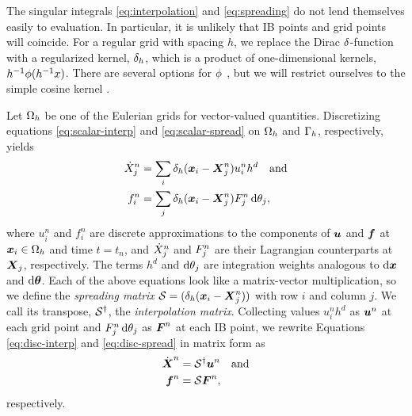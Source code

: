 The singular integrals \eqref{eq:interpolation} and \eqref{eq:spreading} do not lend
themselves easily to evaluation. In particular, it is unlikely that IB points and grid
points will coincide. For a regular grid with spacing $h$, we replace the Dirac
$\delta$-function with a regularized kernel, $\delta_h$, which is a product of
one-dimensional kernels, $h^{-1}\phi(h^{-1}x)$. There are several options for
$\phi$ \cite{Griffith:2020hi}, but we will restrict ourselves to the simple cosine
kernel \cite{Peskin:2002go}.

Let $\Omega_h$ be one of the Eulerian grids for vector-valued quantities. Discretizing
equations \eqref{eq:scalar-interp} and \eqref{eq:scalar-spread} on $\Omega_h$ and
$\Gamma_h$, respectively, yields
\begin{align}
    \label{eq:disc-interp}
    \dot{X}^n_j &= \sum_i \delta_h(\x_i-\X^n_j)u^n_i h^d \quad \text{and} \\
    \label{eq:disc-spread}
    f^n_i &= \sum_j \delta_h(\x_i-\X^n_j)F^n_j \d\theta_j,
\end{align}
where $u^n_i$ and $f^n_i$ are discrete approximations to the components of $\boldsymbol{u}$ and $\boldsymbol{f}$
at $\boldsymbol{x}_i\in\Omega_h$ and time $t=t_n$, and $\dot{X}^n_{\smash j}$ and $F^n_{\smash j}$
are their Lagrangian counterparts at $\boldsymbol{X}_{\smash j}$, respectively. The terms $h^d$ and
$\d\theta_{\smash j}$ are integration weights analogous to $\d\x$ and $\d\params$. Each
of the above equations look like a matrix-vector multiplication, so we define the
\emph{spreading matrix} $\mathcal{S}=(\delta_h(\boldsymbol{x}_i-\boldsymbol{X}^n_{\smash j}))$ with row $i$ and
column $j$. We call its transpose, $\mathcal{S}^\dagger$, the \emph{interpolation matrix}. Collecting
values $u^n_ih^d$ as $\boldsymbol{u}^n$ at each grid point and $F^n_{\smash j}\d\theta_{\smash j}$ as
$\boldsymbol{F}^n$ at each IB point, we rewrite Equations \eqref{eq:disc-interp} and
\eqref{eq:disc-spread} in matrix form as
\begin{align}
    \label{eq:matrix-interp}
    \dot{\boldsymbol{X}}^n &= \mathcal{S}^\dagger\boldsymbol{u}^n \quad\text{and} \\
    \label{eq:matrix-spread}
    \boldsymbol{f}^n &= \mathcal{S}\boldsymbol{F}^n,
\end{align}
respectively.

